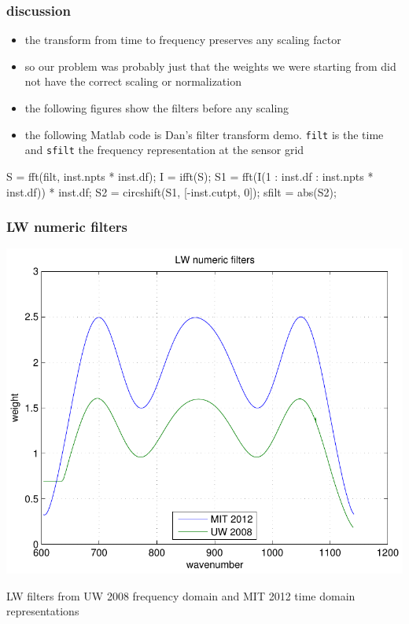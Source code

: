 \documentclass[11pt]{beamer}
\begin{document}
\begin{frame}[fragile]
\frametitle{discussion}

\begin{itemize}
  \item the transform from time to frequency preserves any scaling
    factor

  \item so our problem was probably just that the weights we were
    starting from did not have the correct scaling or normalization

  \item the following figures show the filters before any scaling

  \item the following Matlab code is Dan's filter transform demo.
    \texttt{\small filt} is the time and \texttt{\small sfilt} the
    frequency representation at the sensor grid

\end{itemize}

\begin{semiverbatim}\small
  S = fft(filt, inst.npts * inst.df);
  I = ifft(S);
  S1 = fft(I(1 : inst.df : inst.npts * inst.df)) * inst.df;
  S2 = circshift(S1, [-inst.cutpt, 0]);
  sfilt = abs(S2);
\end{semiverbatim}

\end{frame}
\begin{frame}
\frametitle{LW numeric filters}

\begin{center}
  \includegraphics[scale=0.6]{figures/filters_LW.pdf}
\end{center}

LW filters from UW 2008 frequency domain and MIT 2012 time domain
representations

\end{frame}
\end{document}
